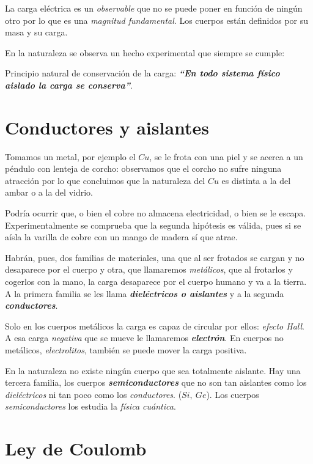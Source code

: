La carga eléctrica es un \emph{observable} que no se puede poner en función de ningún otro por lo que es una \emph{magnitud fundamental}. Los cuerpos están definidos por su masa y su carga.

En la naturaleza se observa un hecho experimental que siempre se cumple:

\begin{miparrafodestacado}
\textsf{Principio natural de conservación de la carga:}	\textbf{\emph{``En todo sistema físico aislado la carga se conserva''}}.
\end{miparrafodestacado}

\section{Conductores y aislantes}

Tomamos un metal, por ejemplo el $Cu$, se le frota con una piel y se acerca a un péndulo con lenteja de corcho: observamos que el corcho no sufre ninguna atracción por lo que concluimos que la naturaleza del $Cu$ es distinta a la del ambar o a la del vidrio.

Podría ocurrir que, o bien el cobre no almacena electricidad, o bien se le escapa. Experimentalmente se comprueba que la segunda hipótesis es válida, pues si se aísla la varilla de cobre con un mango de madera sí que atrae.

Habrán, pues, dos familias de materiales, una que al ser frotados se cargan y no desaparece por el cuerpo y otra, que llamaremos \emph{metálicos}, que al frotarlos y cogerlos con la mano, la carga desaparece por el cuerpo humano y va a la tierra. A la primera familia se les llama \textbf{\emph{ dieléctricos o aislantes}} y a la segunda \textbf{\emph{conductores}}.

Solo en los cuerpos metálicos la carga es capaz de circular por ellos: \emph{efecto Hall}. A esa carga \emph{negativa} que se mueve le llamaremos \textbf{\emph{electrón}}. En cuerpos no metálicos, \emph{electrolitos}, también se puede mover la carga positiva.

En la naturaleza no existe ningún cuerpo que sea totalmente aislante. Hay una tercera familia, los cuerpos \textbf{\emph{semiconductores}} que no son tan aislantes como los \emph{dieléctricos} ni tan poco como los \emph{conductores}. ($Si,\ Ge$). Los cuerpos \emph{semiconductores} los estudia la \emph{física cuántica}.

\section{Ley de Coulomb}

